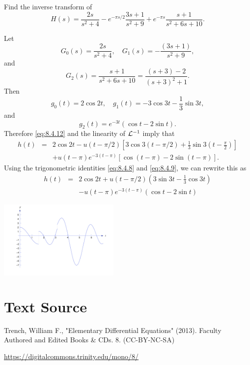 \documentclass{ximera}
\begin{document}
\begin{example}\label{example:8.4.8}
 Find the inverse transform of
$$
H(s)=\frac{2s}{s^2+4}-e^{-\pi s/2} \frac{3s+1}{s^2+9}+e^{-\pi
s}\frac{s+1}{s^2+6s+10}.
$$
\begin{explanation}
Let
$$
G_0(s)=\frac{2s}{s^2+4},\quad G_1(s)=-\frac{(3s+1)}{s^2+9},
$$
and
$$
G_2(s)=\frac{s+1}{s^2+6s+10}=\frac{(s+3)-2}{(s+3)^2+1}.
$$
Then
$$
g_0(t)=2\cos 2t,\quad g_1(t)=-3\cos 3t-\frac{1}{3}\sin 3t,
$$
and
$$
g_2(t)=e^{-3t}(\cos t-2\sin t).
$$
Therefore \eqref{eq:8.4.12} and the linearity of ${\cal L}^{-1}$
imply that
\begin{eqnarray*}
h(t)&=&2\cos 2t-u(t-\pi/2)\left[3\cos
3(t-\pi/2)+\frac{1}{3}\sin 3\left(t-\frac{\pi}{2}\right)\right]\\
&&+u(t-\pi)e^{-3(t-\pi)}\left[\cos (t-\pi)-2\sin (t-\pi)\right].
\end{eqnarray*}
Using the trigonometric identities  \eqref{eq:8.4.8} and
\eqref{eq:8.4.9}, we can rewrite this as
\begin{equation} \label{eq:8.4.13}
\begin{array}{rcl}
h(t)&=&2\cos 2t+u(t-\pi/2)\left(3\sin 3t-
\frac{1}{3}\cos 3t\right)\\
&&-u(t-\pi)e^{-3(t-\pi)} (\cos t-2\sin t)
\end{array}
\end{equation}
\begin{image}
 \includegraphics[height=1.5in]{fig080405.jpg}
 \end{image}
\end{explanation}
\end{example}


\section*{Text Source}
Trench, William F., "Elementary Differential Equations" (2013). Faculty Authored and Edited Books \& CDs. 8. (CC-BY-NC-SA)

\href{https://digitalcommons.trinity.edu/mono/8/}{https://digitalcommons.trinity.edu/mono/8/}
\end{document}
